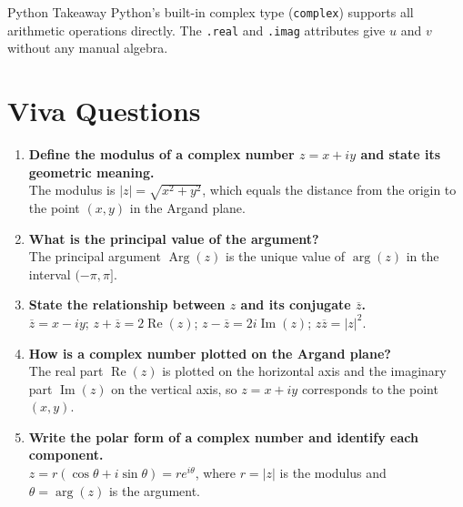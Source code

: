 \documentclass[12pt,a4paper]{article}
\begin{document}
\begin{learnbox}{Python Takeaway}
Python's built-in complex type (\texttt{complex}) supports all arithmetic
operations directly.  The \texttt{.real} and \texttt{.imag} attributes give
\(u\) and \(v\) without any manual algebra.
\end{learnbox}

\section{Viva Questions}

\begin{enumerate}
  \item \textbf{Define the modulus of a complex number \(z = x+iy\) and state
        its geometric meaning.}\\
        The modulus is \(|z| = \sqrt{x^2+y^2}\), which equals the distance
        from the origin to the point \((x,y)\) in the Argand plane.

  \item \textbf{What is the principal value of the argument?}\\
        The principal argument \(\operatorname{Arg}(z)\) is the unique value
        of \(\arg(z)\) in the interval \((-\pi, \pi]\).

  \item \textbf{State the relationship between \(z\) and its conjugate
        \(\overline{z}\).}\\
        \(\overline{z} = x - iy\);  \(z + \overline{z} = 2\operatorname{Re}(z)\);
        \(z - \overline{z} = 2i\operatorname{Im}(z)\);
        \(z\overline{z} = |z|^2\).

  \item \textbf{How is a complex number plotted on the Argand plane?}\\
        The real part \(\operatorname{Re}(z)\) is plotted on the horizontal
        axis and the imaginary part \(\operatorname{Im}(z)\) on the vertical
        axis, so \(z = x+iy\) corresponds to the point \((x,y)\).

  \item \textbf{Write the polar form of a complex number and identify each
        component.}\\
        \(z = r(\cos\theta + i\sin\theta) = re^{i\theta}\), where
        \(r = |z|\) is the modulus and \(\theta = \arg(z)\) is the argument.


\end{enumerate}
\end{document}
